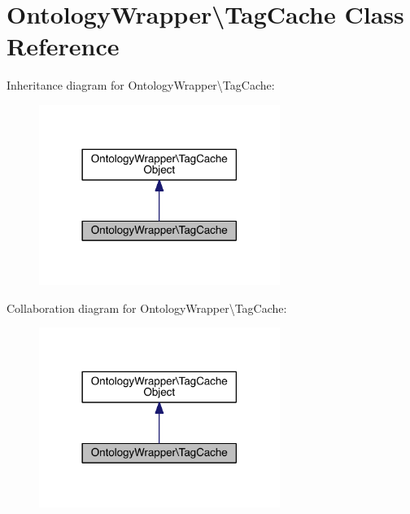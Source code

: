 \hypertarget{class_ontology_wrapper_1_1_tag_cache}{\section{Ontology\-Wrapper\textbackslash{}Tag\-Cache Class Reference}
\label{class_ontology_wrapper_1_1_tag_cache}
}


Inheritance diagram for Ontology\-Wrapper\textbackslash{}Tag\-Cache\-:
\nopagebreak
\begin{figure}[H]
\begin{center}
\leavevmode
\includegraphics[width=222pt]{class_ontology_wrapper_1_1_tag_cache__inherit__graph}
\end{center}
\end{figure}


Collaboration diagram for Ontology\-Wrapper\textbackslash{}Tag\-Cache\-:
\nopagebreak
\begin{figure}[H]
\begin{center}
\leavevmode
\includegraphics[width=222pt]{class_ontology_wrapper_1_1_tag_cache__coll__graph}
\end{center}
\end{figure}
